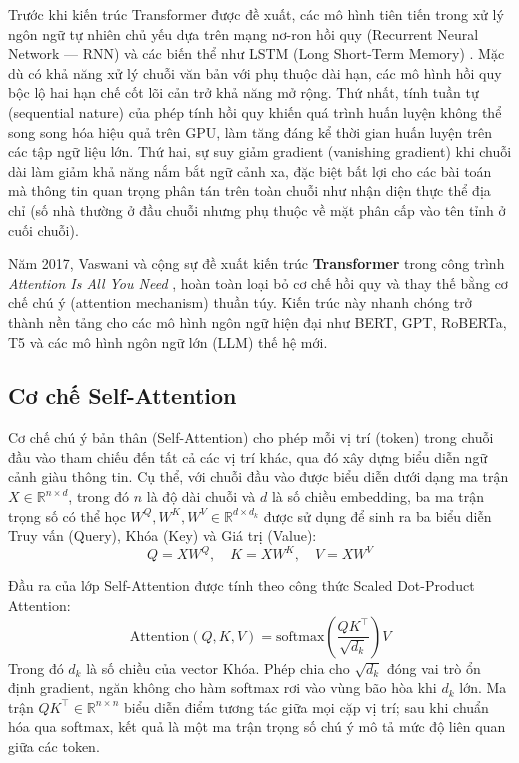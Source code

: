 Trước khi kiến trúc Transformer được đề xuất, các mô hình tiên tiến trong xử lý ngôn ngữ tự nhiên chủ yếu dựa trên mạng nơ-ron hồi quy (Recurrent Neural Network --- RNN) và các biến thể như LSTM (Long Short-Term Memory) \cite{Hochreiter1997}. Mặc dù có khả năng xử lý chuỗi văn bản với phụ thuộc dài hạn, các mô hình hồi quy bộc lộ hai hạn chế cốt lõi cản trở khả năng mở rộng. Thứ nhất, tính tuần tự (sequential nature) của phép tính hồi quy khiến quá trình huấn luyện không thể song song hóa hiệu quả trên GPU, làm tăng đáng kể thời gian huấn luyện trên các tập ngữ liệu lớn. Thứ hai, sự suy giảm gradient (vanishing gradient) khi chuỗi dài làm giảm khả năng nắm bắt ngữ cảnh xa, đặc biệt bất lợi cho các bài toán mà thông tin quan trọng phân tán trên toàn chuỗi như nhận diện thực thể địa chỉ (số nhà thường ở đầu chuỗi nhưng phụ thuộc về mặt phân cấp vào tên tỉnh ở cuối chuỗi).

Năm 2017, Vaswani và cộng sự đề xuất kiến trúc \textbf{Transformer} trong công trình \emph{Attention Is All You Need} \cite{Vaswani2017}, hoàn toàn loại bỏ cơ chế hồi quy và thay thế bằng cơ chế chú ý (attention mechanism) thuần túy. Kiến trúc này nhanh chóng trở thành nền tảng cho các mô hình ngôn ngữ hiện đại như BERT, GPT, RoBERTa, T5 và các mô hình ngôn ngữ lớn (LLM) thế hệ mới.

\subsection{Cơ chế Self-Attention}

Cơ chế chú ý bản thân (Self-Attention) cho phép mỗi vị trí (token) trong chuỗi đầu vào tham chiếu đến tất cả các vị trí khác, qua đó xây dựng biểu diễn ngữ cảnh giàu thông tin. Cụ thể, với chuỗi đầu vào được biểu diễn dưới dạng ma trận $X \in \mathbb{R}^{n \times d}$, trong đó $n$ là độ dài chuỗi và $d$ là số chiều embedding, ba ma trận trọng số có thể học $W^Q, W^K, W^V \in \mathbb{R}^{d \times d_k}$ được sử dụng để sinh ra ba biểu diễn Truy vấn (Query), Khóa (Key) và Giá trị (Value):
\begin{equation}
Q = XW^Q, \quad K = XW^K, \quad V = XW^V
\label{eq:qkv}
\end{equation}

Đầu ra của lớp Self-Attention được tính theo công thức Scaled Dot-Product Attention:
\begin{equation}
\mathrm{Attention}(Q, K, V) = \mathrm{softmax}\!\left(\frac{QK^{\top}}{\sqrt{d_k}}\right) V
\label{eq:attention}
\end{equation}
Trong đó $d_k$ là số chiều của vector Khóa. Phép chia cho $\sqrt{d_k}$ đóng vai trò ổn định gradient, ngăn không cho hàm softmax rơi vào vùng bão hòa khi $d_k$ lớn. Ma trận $QK^{\top} \in \mathbb{R}^{n \times n}$ biểu diễn điểm tương tác giữa mọi cặp vị trí; sau khi chuẩn hóa qua softmax, kết quả là một ma trận trọng số chú ý mô tả mức độ liên quan giữa các token.

